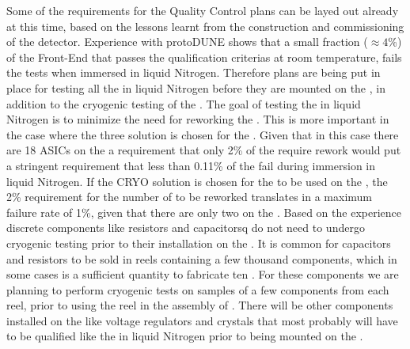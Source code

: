 Some of the requirements for the Quality Control plans can
be layed out already at this time, based on the lessons learnt
from the construction and commissioning of the 
detector. Experience with protoDUNE shows that a small fraction
($\approx4$\%) of the Front-End  that passes the
qualification criterias at room temperature, fails the tests
when immersed in liquid Nitrogen. Therefore plans are being put
in place for testing all the  in liquid Nitrogen
before they are mounted on the , in addition to the
cryogenic testing of the . The goal of testing 
the  in liquid Nitrogen is to minimize the need
for reworking the . This is more important in the
case where the three  solution is chosen for the
. Given that in this case there are 18 ASICs on the
 a requirement that only 2\% of the 
require rework would put a stringent requirement that less than
0.11\% of the  fail during immersion in liquid
Nitrogen. If the CRYO solution is chosen for the 
to be used on the , the 2\% requirement for the
number of  to be reworked translates in a 
maximum failure rate of 1\%, given that there are only two
 on the . Based on the 
experience discrete components like resistors and capacitorsq
do not need to undergo cryogenic testing prior to their installation
on the . It is common for capacitors and resistors
to be sold in reels containing a few thousand components, which
in some cases is a sufficient quantity to fabricate ten
. For these components we are planning to
perform cryogenic tests on samples of a few components
from each reel, prior to using the reel in the assembly of
. There will be other components installed on
the  like voltage regulators and crystals that
most probably will have to be qualified like the 
in liquid Nitrogen prior to being mounted on the .

